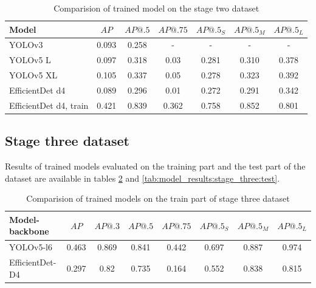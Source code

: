 \begin{table}[h]
    \centering
    \begin{tabular}{|l|c|c|c|c|c|c|}
        \hline
        Model                  & $AP$  & $AP@.5$ & $AP@.75$ & $AP@.5_S$ & $AP@.5_M$ & $AP@.5_L$ \\ \hline
        YOLOv3                 & 0.093 & 0.258   & -        & -         & -         & -         \\ \hline
        YOLOv5 L               & 0.097 & 0.318   & 0.03     & 0.281     & 0.310     & 0.378     \\ \hline
        YOLOv5 XL              & 0.105 & 0.337   & 0.05     & 0.278     & 0.323     & 0.392     \\ \hline
        EfficientDet d4        & 0.089 & 0.296   & 0.01     & 0.272     & 0.291     & 0.342     \\ \hline
        EfficientDet d4, train & 0.421 & 0.839   & 0.362    & 0.758     & 0.852     & 0.801     \\ \hline
    \end{tabular}
    \caption{Comparision of trained model on the stage two dataset}
    \label{tab:model_results:stage_two}
\end{table}

\subsection{Stage three dataset}
Results of trained models evaluated on the training part and the test part of the dataset are available in tables \ref{tab:model_results:stage_three:train} and \ref{tab:model_results:stage_three:test}.

\begin{table}[H]
    \centering
    \begin{tabular}{|l|c|c|c|c|c|c|c|}
        \hline
        Model-backbone  & $AP$  & $AP@.3$ & $AP@.5$ & $AP@.75$ & $AP@.5_S$ & $AP@.5_M$ & $AP@.5_L$ \\ \hline
        YOLOv5-l6       & 0.463 & 0.869   & 0.841   & 0.442    & 0.697     & 0.887     & 0.974     \\ \hline
        EfficientDet-D4 & 0.297 & 0.82    & 0.735   & 0.164    & 0.552     & 0.838     & 0.815     \\ \hline
    \end{tabular}
    \caption{Comparision of trained models on the train part of stage three dataset}
    \label{tab:model_results:stage_three:train}
\end{table}

